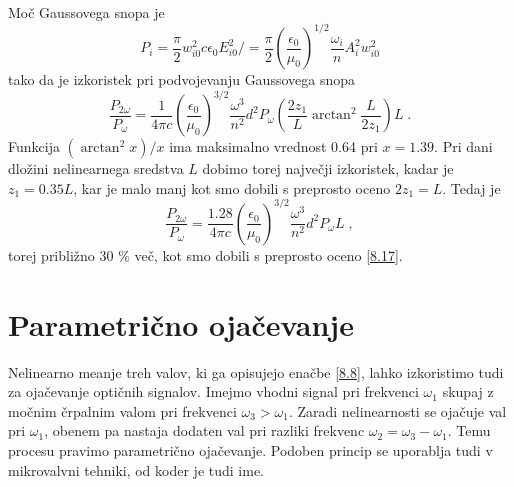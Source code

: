 \documentclass[11pt,fleqn]{book} %
\begin{document}
 Moč Gaussovega snopa je 
\begin{equation}
P_{i}=\frac{\pi}{2}w_{i0}^{2}c\epsilon_{0}E_{i0}^{2}/=\frac{\pi}{2}\left(\frac{\epsilon_{0}}{\mu_{0}}\right)^{1/2}\frac{\omega_{i}}{n}A_{i}^{2}w_{i0}^{2}\label{8.26}
\end{equation}
 tako da je izkoristek pri podvojevanju Gaussovega snopa 
\begin{equation}
\frac{P_{2\omega}}{P_{\omega}}=\frac{1}{4\pi c}\left(\frac{\epsilon_{0}}{\mu_{0}}\right)^{3/2}\frac{\omega^{3}}{n^{2}}d^{2}P_{\omega}\left(\frac{2z_{1}}{L}\arctan^{2}\frac{L}{2z_{1}}\right)L\;.\label{8.27}
\end{equation}
 Funkcija $(\arctan^{2}x)/x$ ima maksimalno vrednost 0.64 pri $x=1.39$.
Pri dani dložini nelinearnega sredstva $L$ dobimo torej največji
izkoristek, kadar je $z_{1}=0.35L$, kar je malo manj kot smo dobili
s preprosto oceno $2z_{1}=L$. Tedaj je 
\begin{equation}
\frac{P_{2\omega}}{P_{\omega}}=\frac{1.28}{4\pi c}\left(\frac{\epsilon_{0}}{\mu_{0}}\right)^{3/2}\frac{\omega^{3}}{n^{2}}d^{2}P_{\omega}L\;,\label{8.28}
\end{equation}
 torej približno 30 \% več, kot smo dobili s preprosto oceno \ref{8.17}.


\section{Parametrično ojačevanje}

Nelinearno me{anje treh valov, ki ga opisujejo enačbe \ref{8.8},
lahko izkoristimo tudi za ojačevanje optičnih signalov. Imejmo vhodni
signal pri frekvenci $\omega_{1}$ skupaj z močnim črpalnim valom
pri frekvenci $\omega_{3}>\omega_{1}$. Zaradi nelinearnosti se ojačuje
val pri $\omega_{1}$, obenem pa nastaja dodaten val pri razliki frekvenc
$\omega_{2}=\omega_{3}-\omega_{1}$. Temu procesu pravimo parametrično
ojačevanje. Podoben princip se uporablja tudi v mikrovalvni tehniki,
od koder je tudi ime. }
\end{document}
